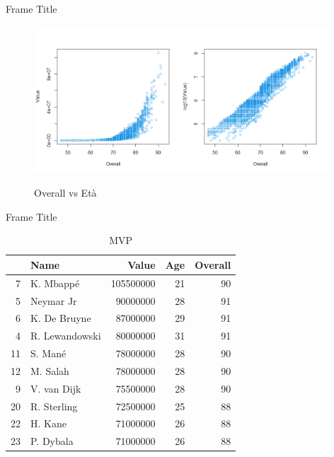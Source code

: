 \documentclass[aspectratio=169,xcolor=dvipsnames]{beamer}
\begin{document}
\begin{frame}{Frame Title}
\begin{figure}[H] 
\begin{center} 
  \includegraphics[width=11cm]{Rplot4.png}\\ 
  \caption{Overall vs Età} 
\end{center} 
\end{figure}
\end{frame}


\begin{frame}{Frame Title}
\begin{table}[ht]
\centering
\begin{tabular}{rlrrr}
  \hline
 & Name & Value & Age & Overall \\ 
  \hline
7 & K. Mbappé & 105500000 &  21 &  90 \\ 
  5 & Neymar Jr & 90000000 &  28 &  91 \\ 
  6 & K. De Bruyne & 87000000 &  29 &  91 \\ 
  4 & R. Lewandowski & 80000000 &  31 &  91 \\ 
  11 & S. Mané & 78000000 &  28 &  90 \\ 
  12 & M. Salah & 78000000 &  28 &  90 \\ 
  9 & V. van Dijk & 75500000 &  28 &  90 \\ 
  20 & R. Sterling & 72500000 &  25 &  88 \\ 
  22 & H. Kane & 71000000 &  26 &  88 \\ 
  23 & P. Dybala & 71000000 &  26 &  88 \\ 
   \hline
\end{tabular}
\caption{MVP}
\end{table}
\end{frame}

\end{document}
